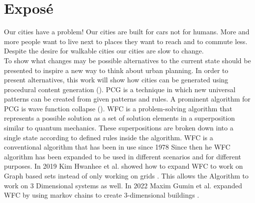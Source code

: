 
\chapter*{Exposé}
\label{cha:Expose}

\thispagestyle{empty}

Our cities have a problem! Our cities are built for cars not for humans. More and more people want to live next to places they want to reach and to commute less. Despite the desire for walkable cities our cities are slow to change. 
\\
To show what changes may be possible alternatives to the current state should be presented to inspire a new way to think about urban planning.  In order to present alternatives, this work will show how cities can be generated using procedural content generation (). PCG is a technique in which new universal patterns can be created from given patterns and rules. A prominent algorithm for PCG is wave function collapse (). WFC is a problem-solving algorithm that represents a possible solution as a set of solution elements in a superposition similar to quantum mechanics. These superpositions are broken down into a single state according to defined rules inside the algorithm.  WFC is a conventional algorithm that has been in use since 1978  Since then he WFC algorithm has been expanded to be used in different scenarios and for different purposes. In 2019 Kim Hwanhee et al. showed how to expand WFC to work on Graph based sets instead of only working on grids . This allows the Algorithm to work on 3 Dimensional systems as well. In 2022 Maxim Gumin et al. expanded WFC by using markov chains to create 3-dimensional buildings . 
\\
\\

